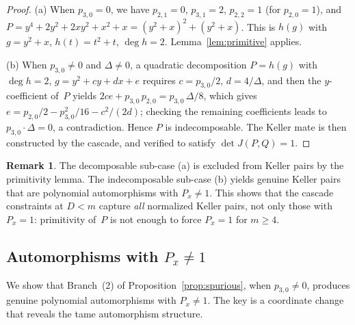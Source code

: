 \documentclass[12pt,a4paper]{article}
\theoremstyle{definition}
\newtheorem{remark}[theorem]{Remark}
\begin{document}
\begin{proof}
(a) When $p_{3,0} = 0$, we have $p_{2,1} = 0$, $p_{3,1} = 2$,
$p_{2,2} = 1$ (for $p_{2,0} = 1$), and $P = y^4 + 2y^2 + 2xy^2 + x^2 + x
= (y^2+x)^2 + (y^2+x)$. This is $h(g)$ with $g = y^2 + x$,
$h(t) = t^2+t$, $\deg h = 2$. Lemma~\ref{lem:primitive} applies.

(b) When $p_{3,0} \neq 0$ and $\Delta \neq 0$, a quadratic decomposition
$P = h(g)$ with $\deg h = 2$, $g = y^2 + cy + dx + e$ requires
$c = p_{3,0}/2$, $d = 4/\Delta$, and then the $y$-coefficient of~$P$
yields $2ce + p_{3,0}\,p_{2,0} = p_{3,0}\,\Delta/8$, which gives
$e = p_{2,0}/2 - p_{3,0}^2/16 - c^2/(2d)$; checking the remaining
coefficients leads to $p_{3,0} \cdot \Delta = 0$, a contradiction.
Hence $P$ is indecomposable. The Keller mate is then constructed
by the cascade, and verified to satisfy $\det J(P,Q) = 1$.
\end{proof}

\begin{remark}\label{rem:spurious-correction}
The decomposable sub-case (a) is excluded from Keller pairs by
the primitivity lemma. The indecomposable sub-case (b) yields
genuine Keller pairs that are polynomial automorphisms with $P_x \neq 1$.
This shows that the cascade constraints at $D < m$ capture
\emph{all} normalized Keller pairs, not only those with $P_x = 1$:
primitivity of~$P$ is not enough to force $P_x = 1$ for $m \geq 4$.
\end{remark}

\subsection{Automorphisms with \texorpdfstring{$P_x \neq 1$}{Px != 1}}%
\label{sec:auto-px-neq-1}

We show that Branch~(2) of Proposition~\ref{prop:spurious},
when $p_{3,0} \neq 0$, produces genuine polynomial automorphisms
with $P_x \neq 1$. The key is a coordinate change that reveals
the tame automorphism structure.
\end{document}
